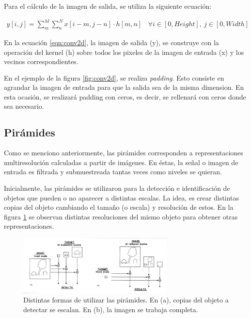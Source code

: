 \documentclass[12pt, letterpaper]{article}
\begin{document}
\par Para el cálculo de la imagen de salida, se utiliza la siguiente ecuación:

\begin{align}
  y[i,j] = \sum_{m}^{M} \sum_{n}^{N} x[i-m, j-n] \cdot h[m,n] \: \: \: \: \forall i \in [0,Height], \: j \in [0,Width]
  \label{eqn:conv2d}
\end{align}

\par En la ecuación \ref{eqn:conv2d}, la imagen de salida (y), se construye con la operación del kernel (h) sobre todos los pixeles de la imagen de entrada (x) y los vecinos correspondientes.

\par En el ejemplo de la figura \ref{fig:conv2d}, se realiza \textit{padding}. Esto consiste en agrandar la imagen de entrada para que la salida sea de la misma dimension. En esta ocasión, se realizará padding con ceros, es decir, se rellenará con ceros donde sea necesario.

\subsection{Pirámides}
\par Como se menciono anteriormente, las pirámides corresponden a representaciones multi\-resolución calculadas a partir de imágenes. En éstas, la señal o imagen de entrada es filtrada y submuestreada tantas veces como niveles se quieran.


\par Inicialmente, las pirámides se utilizaron para la detección e identificación de objetos que pueden o no aparecer a distintas escalas. La idea, es crear distintas copias del objeto cambiando el tamaño (o escala) y resolución de estos. En la figura \ref{fig:pyramidPaper} se observan distintas resoluciones del mismo objeto para obtener otras representaciones.

\begin{figure}[H]
  \centering
  \includegraphics[width = 0.7\textwidth]{pyramid_paper.png}
  \caption{Distintas formas de utilizar las pirámides. En (a), copias del objeto a detectar se escalan. En (b), la imagen se trabaja completa. \cite{paperPyramids}}
  \label{fig:pyramidPaper}
\end{figure}
\end{document}
